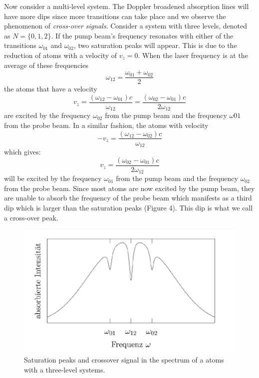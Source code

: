 \documentclass{article}
\begin{document}
Now consider a multi-level system. The Doppler broadened absorption lines will have more dips since more transitions can take place and we observe the phenomenon of \textit{cross-over signals}.
Consider a system with three levels, denoted as $N=\{0, 1, 2\}$. If the pump beam’s frequency resonates with either of the transitions $\omega_{01}$ and $\omega_{02}$, two saturation peaks will appear. This is due to the reduction of atoms with a velocity of $v_z = 0$. When the laser frequency is at the average of these frequencies 
\begin{equation}
    \omega_{12} = \frac{\omega_{01}+\omega_{02}}{2}
\end{equation}
the atoms that have a velocity 
\begin{equation}
    v_z = \frac{(\omega_{12}-\omega_{01})c}{\omega_{12}} = \frac{(\omega_{02}-\omega_{01})c}{2\omega_{12}} 
\end{equation}
are excited by the frequency $\omega_{02}$ from the pump beam and the frequency $\omega{01}$ from the probe beam. In a similar fashion, the atoms with velocity 
\begin{equation}
   - v_z = \frac{(\omega_{12}-\omega_{02})c}{\omega_{12}} 
\end{equation}
which gives: 
\begin{equation}
    v_z = \frac{(\omega_{02}-\omega_{01})c}{2\omega_{12}}
\end{equation}
will be excited by the frequency $\omega_{01}$ from the pump beam and the frequency $\omega_{02}$ from the probe beam. Since most atoms are now excited by the pump beam, they are unable to absorb the frequency of the probe beam which manifests as a third dip which is larger than the saturation peaks (Figure 4). This dip is what we call a cross-over peak.

\begin{figure}[h]
    \centering
    \includegraphics[width=0.5\linewidth]{Figures/4.png}
    \caption{Saturation peaks and crossover signal in the spectrum of a atoms with a three-level systems.}
    \label{fig:enter-label}
\end{figure}
\end{document}
